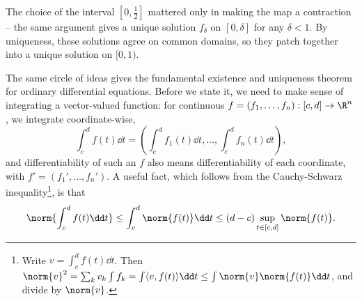 \begin{remark}
    The choice of the interval $[0, \tfrac{1}{2}]$ mattered only in making the map a contraction -- the same argument gives a unique solution $f_{\delta}$ on $[0, \delta]$ for any $\delta < 1$. By uniqueness, these solutions agree on common domains, so they patch together into a unique solution on $[0, 1)$.
\end{remark}

The same circle of ideas gives the fundamental existence and uniqueness theorem for ordinary differential equations. Before we state it, we need to make sense of integrating a vector-valued function: for continuous $f = (f_1, \dots, f_n): [c, d] \rightarrow \R^n$, we integrate coordinate-wise,
$$
\int_c^d f(t) \dd t = \left( \int_c^d f_1(t) \dd t, \dots, \int_c^d f_n(t)\dd t \right),
$$
and differentiability of such an $f$ also means differentiability of each coordinate, with $f' = (f_1', \dots, f_n')$. A useful fact, which follows from the Cauchy-Schwarz inequality\footnote{Write $v = \int_c^d f(t) \dd t$. Then $\norm{v}^2 = \sum_k v_k \int f_k = \int \langle v, f(t)\rangle \dd t \leq \int \norm{v} \norm{f(t)} \dd t$, and divide by $\norm{v}$.}, is that
$$
\norm{\int_c^d f(t) \dd t} \leq \int_c^d \norm{f(t)} \dd t \leq (d - c)\sup_{t \in [c, d]} \norm{f(t)}.
$$


